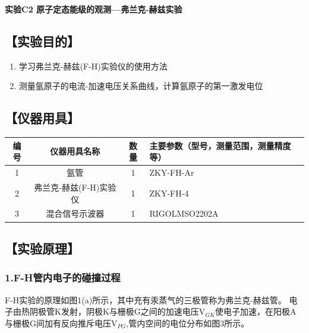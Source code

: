 \documentclass[12pt,a4paper,UTF8]{ctexart}
\begin{document}

\begin{center}
\LARGE\textbf{实验C2 原子定态能级的观测—弗兰克-赫兹实验}
\end{center}




\subsection*{【实验目的】}
	\begin{enumerate}[(1)]
		\item 学习弗兰克-赫兹(F-H)实验仪的使用方法
		\item 测量氩原子的电流-加速电压关系曲线，计算氩原子的第一激发电位
	\end{enumerate}

\subsection*{【仪器用具】}


	\begin{table}[htbp]
	  \centering
	    \begin{tabular}{cccp{20em}}
	    \toprule
	    编号    & 仪器用具名称 & 数量    & 主要参数（型号，测量范围，测量精度等） \\
	    \midrule
	    1     & 氩管 & 1     & ZKY-FH-Ar \\
		2     & 弗兰克-赫兹(F-H)实验仪  & 1     & ZKY-FH-4 \\
		3     &混合信号示波器 & 1 & RIGOLMSO2202A  \\
	    \bottomrule
	    \end{tabular}%
	  \label{tab:device}%
	\end{table}%

\subsection*{【实验原理】}

	\subsubsection*{1.F-H管内电子的碰撞过程}
F-H实验的原理如图1(a)所示，其中充有汞蒸气的三极管称为弗兰克-赫兹管。
电子由热阴极管K发射，阴极K与栅极G之间的加速电压V$_{GK}$使电子加速，在阳极A与栅极G间加有反向推斥电压V$_{PG}$,管内空间的电位分布如图3所示。
\end{document}
